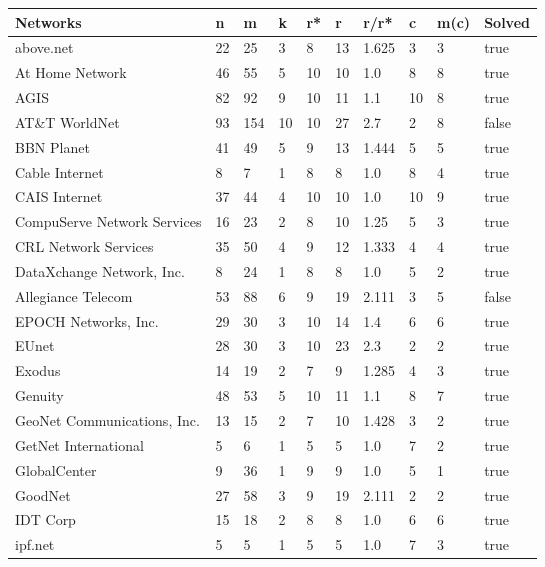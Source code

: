 \documentclass [12pt]{article}
\begin{document}
  \thispagestyle{empty}
  \begin {table}[H]
  \begin{tabular}{ | l | l | l | l | l | l | l | l | l | l | }
    \hline
    Networks & n & m & k & r* & r & r/r* & c & m(c) & Solved\\ \hline
    above.net & 22 & 25 & 3 & 8 & 13 & 1.625 & 3 & 3 & true\\ \hline
    At Home Network & 46 & 55 & 5 & 10 & 10 & 1.0 & 8 & 8 & true\\ \hline
    AGIS & 82 & 92 & 9 & 10 & 11 & 1.1 & 10 & 8 & true\\ \hline
    AT\&T WorldNet & 93 & 154 & 10 & 10 & 27 & 2.7 & 2 & 8 & false\\ \hline
    BBN Planet & 41 & 49 & 5 & 9 & 13 & 1.444 & 5 & 5 & true\\ \hline
    Cable Internet & 8 & 7 & 1 & 8 & 8 & 1.0 & 8 & 4 & true\\ \hline
    CAIS Internet & 37 & 44 & 4 & 10 & 10 & 1.0 & 10 & 9 & true\\ \hline
    CompuServe Network Services & 16 & 23 & 2 & 8 & 10 & 1.25 & 5 & 3 & true\\ \hline
    CRL Network Services & 35 & 50 & 4 & 9 & 12 & 1.333 & 4 & 4 & true\\ \hline
    DataXchange Network, Inc. & 8 & 24 & 1 & 8 & 8 & 1.0 & 5 & 2 & true\\ \hline
    Allegiance Telecom & 53 & 88 & 6 & 9 & 19 & 2.111 & 3 & 5 & false\\ \hline
    EPOCH Networks, Inc. & 29 & 30 & 3 & 10 & 14 & 1.4 & 6 & 6 & true\\ \hline
    EUnet & 28 & 30 & 3 & 10 & 23 & 2.3 & 2 & 2 & true\\ \hline
    Exodus & 14 & 19 & 2 & 7 & 9 & 1.285 & 4 & 3 & true\\ \hline
    Genuity & 48 & 53 & 5 & 10 & 11 & 1.1 & 8 & 7 & true\\ \hline
    GeoNet Communications, Inc. & 13 & 15 & 2 & 7 & 10 & 1.428 & 3 & 2 & true\\ \hline
    GetNet International & 5 & 6 & 1 & 5 & 5 & 1.0 & 7 & 2 & true\\ \hline
    GlobalCenter & 9 & 36 & 1 & 9 & 9 & 1.0 & 5 & 1 & true\\ \hline
    GoodNet & 27 & 58 & 3 & 9 & 19 & 2.111 & 2 & 2 & true\\ \hline
    IDT Corp & 15 & 18 & 2 & 8 & 8 & 1.0 & 6 & 6 & true\\ \hline
    ipf.net & 5 & 5 & 1 & 5 & 5 & 1.0 & 7 & 3 & true\\ \hline

\end{tabular}
\end{table}
\end{document}
